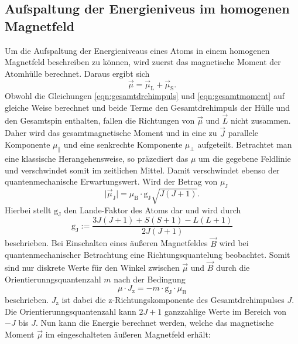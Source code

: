 \subsection{Aufspaltung der Energieniveus im homogenen Magnetfeld}
\label{sec:aufspaltung}
Um die Aufspaltung der Energieniveaus eines Atoms in einem homogenen Magnetfeld
beschreiben zu können, wird zuerst das magnetische Moment der Atomhülle berechnet.
Daraus ergibt sich
\begin{equation}
  \vec{\mu} = \vec{\mu}_\text{L} + \vec{\mu}_\text{S}.
  \label{eqn:gesamtmoment}
\end{equation}
Obwohl die Gleichungen \ref{eqn:gesamtdrehimpuls} und \ref{eqn:gesamtmoment}
auf gleiche Weise berechnet und beide Terme den Gesamtdrehimpuls der Hülle und
den Gesamtspin enthalten, fallen die Richtungen von $\vec{\mu}$ und $\vec{L}$
nicht zusammen. Daher wird das gesamtmagnetische Moment und in eine zu $\vec{J}$
parallele Komponente $\mu_{\parallel}$ und eine senkrechte Komponente $\mu_{\bot}$
aufgeteilt. Betrachtet man eine klassische Herangehensweise, so präzediert das
$\mu$ um die gegebene Feldlinie und verschwindet somit im zeitlichen Mittel. Damit
verschwindet ebenso der quantenmechanische Erwartungswert. Wird der Betrag von
$\mu_\text{J}$
\begin{equation}
  \mid \vec{\mu}_\text{J} \mid = \mu_\text{B}\cdot \text{g}_\text{J} \sqrt{J\left(J+1 \right)}.
\end{equation}
Hierbei stellt $\text{g}_\text{J}$ den Lande-Faktor des Atoms dar und wird durch
\begin{equation}
  \text{g}_\text{J} := \frac{3J\left(J+1 \right) + S\left(S+1 \right) - L\left(L+1 \right)}{2J\left(J+1 \right)}
  \label{eqn:lande}
\end{equation}
beschrieben.
Bei Einschalten eines äußeren Magnetfeldes $\vec{B}$ wird bei quantenmechanischer
Betrachtung eine Richtungsquantelung beobachtet. Somit sind nur diskrete Werte für
den Winkel zwischen $\vec{\mu}$ und $\vec{B}$ durch die
Orientierunngsquantenzahl $m$ nach der Bedingung
\begin{equation}
  \mu \cdot J_\text{z} = - m \cdot \text{g}_\text{J}\cdot \mu_\text{B}
  \label{eqn:bedingung}
\end{equation}
beschrieben. $J_\text{z}$ ist dabei die z-Richtungskomponente des Gesamtdrehimpulses
$J$. Die Orientierunngsquantenzahl kann $2J+1$ ganzzahlige Werte im Bereich von
$-J$ bis $J$.
Nun kann die Energie berechnet werden, welche das magnetische Moment $\vec{\mu}$
im eingeschalteten äußeren Magnetfeld erhält:

